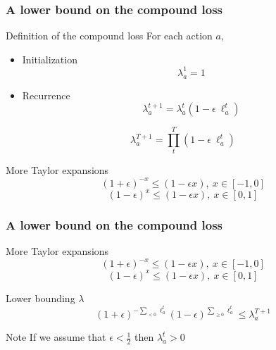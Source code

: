 \documentclass{beamer}
\begin{document}
\begin{frame}
    \frametitle{A lower bound on the compound loss}

    \begin{block}{Definition of the compound loss}
    For each action $a$,
    \begin{itemize}
        \item Initialization
            \begin{equation*}
                \lambda_a^1 = 1
            \end{equation*}
        \item Recurrence
            \begin{equation*}
                \lambda_a^{t+1} = \lambda_a^t (1 -
                \epsilon~\ell_a^t)
            \end{equation*}
    \end{itemize}

    \begin{equation*}
    \lambda_a^{T+1} = \prod_t^T (1 - \epsilon~\ell_a^t)
    \end{equation*}
    \end{block}

    \begin{block}{More Taylor expansions}
    \begin{equation*}
        (1 + \epsilon)^{-x} \leq (1 - \epsilon x), ~ x \in[-1, 0]
    \end{equation*}
    \begin{equation*}
        (1 - \epsilon)^x \leq (1 - \epsilon x), ~ x \in[0, 1]
    \end{equation*}
    \end{block}

\end{frame}

\begin{frame}
    \frametitle{A lower bound on the compound loss}


    \begin{block}{More Taylor expansions}
    \begin{equation*}
        (1 + \epsilon)^{-x} \leq (1 - \epsilon x), ~ x \in[-1, 0]
    \end{equation*}
    \begin{equation*}
        (1 - \epsilon)^x \leq (1 - \epsilon x), ~ x \in[0, 1]
    \end{equation*}
    \end{block}

    \begin{block}{Lower bounding $\lambda$}
    \alert{\begin{equation*}
        (1 + \epsilon)^{- \sum_{< 0} \ell_a^t}
        (1 - \epsilon)^{\sum_{\geq 0} \ell_a^t}
        \leq \lambda_a^{T+1}
    \end{equation*}}
    \end{block}

    \begin{block}{Note}
        If we assume that $\epsilon < \frac{1}{2}$ then $\lambda_a^t > 0$
    \end{block}

\end{frame}
\end{document}
